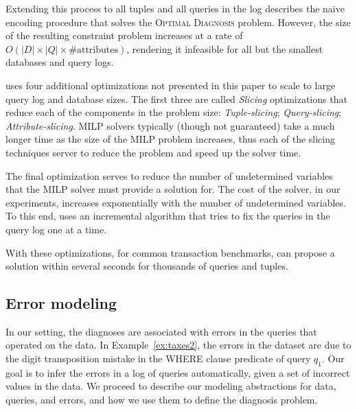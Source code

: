 Extending this process to all tuples and all queries in the log 
describes the naive encoding procedure that solves the
\textsc{Optimal Diagnosis} problem.
However, the size of the resulting constraint problem increases 
at a rate of $O(|D|\times |Q|\times \mathrm{\#attributes})$, rendering
it infeasible for all but the smallest databases and query logs.


\sys uses four additional optimizations not presented in this paper 
to scale to large query log and database sizes.  The first three are
called {\it Slicing} optimizations that reduce each of the components in the problem size:
{\it Tuple-slicing}; {\it Query-slicing}; {\it Attribute-slicing}. 
MILP solvers typically (though not guaranteed) take a much longer time as the size of the MILP problem increases, thus
each of the slicing techniques server to reduce the problem and speed up the solver time.

The final optimization serves to reduce the number of undetermined variables that the MILP solver must
provide a solution for.  The cost of the solver, in our experiments, increases exponentially with the number of 
undetermined variables.  To this end, \sys uses an incremental algorithm that tries to fix the queries in the query
log one at a time.

With these optimizations, for common transaction benchmarks, \sys can propose a solution within several seconds
for thousands of queries and tuples.


















% 

\subsection{Error modeling}
\label{sec:model}

In our setting, the diagnoses are associated with errors in the queries that
operated on the data. In Example~\ref{ex:taxes2}, the errors in the dataset
are due to the digit transposition mistake in the WHERE clause predicate of
query $q_1$. Our goal is to infer the errors in a log of queries
automatically, given a set of incorrect values in the data. We proceed to
describe our modeling abstractions for data, queries, and errors, and how we
use them to define the diagnosis problem.

